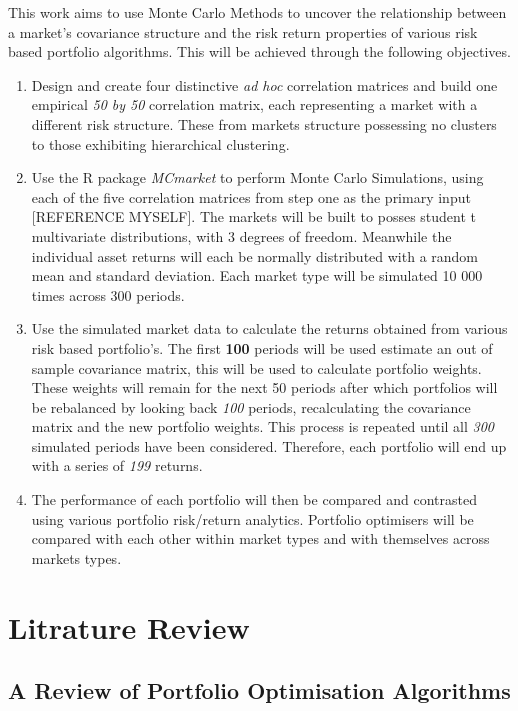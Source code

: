 \documentclass[11pt,preprint, authoryear]{elsarticle}
\numberwithin{equation}{section}
\numberwithin{figure}{section}
\numberwithin{table}{section}
\begin{document}
This work aims to use Monte Carlo Methods to uncover the relationship
between a market's covariance structure and the risk return properties
of various risk based portfolio algorithms. This will be achieved
through the following objectives.

\begin{enumerate}
\def\labelenumi{\arabic{enumi}.}
\item
  Design and create four distinctive \emph{ad hoc} correlation matrices
  and build one empirical \emph{50 by 50} correlation matrix, each
  representing a market with a different risk structure. These from
  markets structure possessing no clusters to those exhibiting
  hierarchical clustering.
\item
  Use the R package \emph{MCmarket} to perform Monte Carlo Simulations,
  using each of the five correlation matrices from step one as the
  primary input {[}REFERENCE MYSELF{]}. The markets will be built to
  posses student t multivariate distributions, with 3 degrees of
  freedom. Meanwhile the individual asset returns will each be normally
  distributed with a random mean and standard deviation. Each market
  type will be simulated 10 000 times across 300 periods.
\item
  Use the simulated market data to calculate the returns obtained from
  various risk based portfolio's. The first \textbf{100} periods will be
  used estimate an out of sample covariance matrix, this will be used to
  calculate portfolio weights. These weights will remain for the next 50
  periods after which portfolios will be rebalanced by looking back
  \emph{100} periods, recalculating the covariance matrix and the new
  portfolio weights. This process is repeated until all \emph{300}
  simulated periods have been considered. Therefore, each portfolio will
  end up with a series of \emph{199} returns.
\item
  The performance of each portfolio will then be compared and contrasted
  using various portfolio risk/return analytics. Portfolio optimisers
  will be compared with each other within market types and with
  themselves across markets types.
\end{enumerate}

\hypertarget{litrature-review}{%
\section{Litrature Review}\label{litrature-review}}

\hypertarget{a-review-of-portfolio-optimisation-algorithms}{%
\subsection{A Review of Portfolio Optimisation
Algorithms}\label{a-review-of-portfolio-optimisation-algorithms}}
\end{document}
